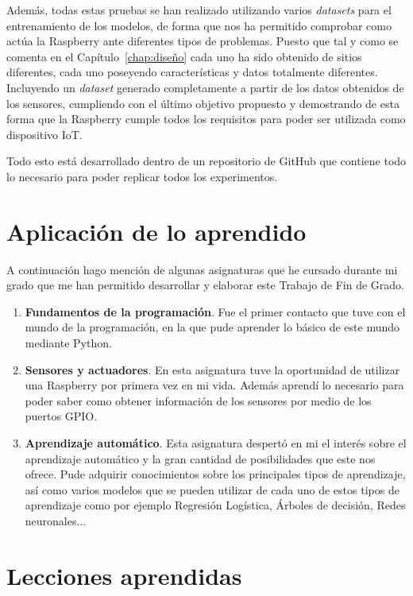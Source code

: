 \documentclass[a4paper, 12pt]{book}
\begin{document}
Además, todas estas pruebas se han realizado utilizando varios \textit{datasets} para el entrenamiento de los modelos, de forma que nos ha permitido comprobar como actúa la Raspberry ante diferentes tipos de problemas. Puesto que tal y como se comenta en el Capítulo~\ref{chap:diseño} cada uno ha sido obtenido de sitios diferentes, cada uno poseyendo características y datos totalmente diferentes. Incluyendo un \textit{dataset} generado completamente a partir de los datos obtenidos de los sensores, cumpliendo con el último objetivo propuesto y demostrando de esta forma que la Raspberry cumple todos los requisitos para poder ser utilizada como dispositivo IoT.

Todo esto está desarrollado dentro de un repositorio de GitHub que contiene todo lo necesario para poder replicar todos los experimentos.

\section{Aplicación de lo aprendido}
\label{sec:aplicacion}

A continuación hago mención de algunas asignaturas que he cursado durante mi grado que me han permitido desarrollar y elaborar este Trabajo de Fin de Grado.

\begin{enumerate}
    \item \textbf{Fundamentos de la programación}. Fue el primer contacto que tuve con el mundo de la programación, en la que pude aprender lo básico de este mundo mediante Python.

    \item \textbf{Sensores y actuadores}. En esta asignatura tuve la oportunidad de utilizar una Raspberry por primera vez en mi vida. Además aprendí lo necesario para poder saber como obtener información de los sensores por medio de los puertos GPIO.
    
    \item \textbf{Aprendizaje automático}. Esta asignatura despertó en mi el interés sobre el aprendizaje automático y la gran cantidad de posibilidades que este nos ofrece. Pude adquirir conocimientos sobre los principales tipos de aprendizaje, así como varios modelos que se pueden utilizar de cada uno de estos tipos de aprendizaje como por ejemplo Regresión Logística, Árboles de decisión, Redes neuronales...

\end{enumerate}


\section{Lecciones aprendidas}
\label{sec:lecciones_aprendidas}
\end{document}
